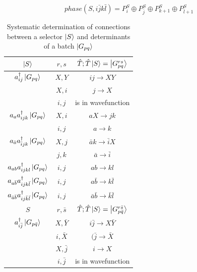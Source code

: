 \documentclass[./thesis.tex]{subfiles}
\newcommand{\Gpqrs}{\ket{G^{rs}_{pq}}}
\begin{document}
\begin{equation}
phase(S,i\bar jk\bar l) = P^S_i \oplus P^S_{\bar j} \oplus P^S_{k+1} \oplus P^S_{\bar l+1}
\end{equation}

\newcommand{\Gpq}{\ket {G_{pq}}}
\newcommand{\Gpbq}{\ket {G_{p \bar q}}}

\begin{table}

\caption{Systematic determination of connections between a selector $\ket S$ and determinants of a batch $\Gpq$} 
\label{tab:systematic_determination}
\begin{center}
	\begin{tabular}{ c|c|c }
		\hline \hline \rule{0pt}{3ex}
		$\ket S$									&$ r, s$ 	& $\hat T ; \hat T \ket S = \Gpqrs$	\\
		\hline \hline \rule{0pt}{3ex}
		$\ac {ij} \Gpq$						& $X,Y$ 	&$ij \rightarrow XY$		\\
											& $X,i$ 	&$j \rightarrow X$		\\
											& $i,j$ 	&is in wavefunction			\\
		\hline \rule{0pt}{3ex}
		$\an a \ac {ijk} \Gpq$				&$X,i$		&$aX \rightarrow jk$		\\
											&$i,j$		&$a \rightarrow k$		\\
		\hline \rule{0pt}{3ex}
		$\an {\bar a} \ac {\bar i jk} \Gpq$	&$X,j$		&$\bar a k \rightarrow \bar i X$		\\
											&$j,k$		&$\bar a \rightarrow \bar i$		\\
		\hline \rule{0pt}{3ex}
		$\an {ab} \ac {ijkl} \Gpq$			&$i,j$		&$ab \rightarrow kl$		\\
		\hline \rule{0pt}{3ex}
		$\an {a  \bar b} \ac {ijk \bar l} \Gpq$			&$i,j$		&$a \bar b \rightarrow k \bar l$		\\
		\hline \rule{0pt}{3ex}
		$\an {\bar a \bar b} \ac {i j \bar k \bar l} \Gpq$	&$i,j$		&$\bar a \bar b \rightarrow \bar k \bar l$		\\
		
		\hline \hline \rule{0pt}{3ex}
		$S$									&$ r, \bar s$ 	& $\hat T ; \hat T \ket S = \ket {G_{p \bar q}^{r \bar s}}$	\\
		\hline \hline \rule{0pt}{3ex}
		$\ac {i \bar j} \Gpbq$				& $X, \bar Y$ 	&$i \bar j \rightarrow X \bar Y$		\\
											& $i,\bar X$ 		&$(\bar j \rightarrow \bar X$		\\
											& $X,\bar j$ 	&$i \rightarrow X$		\\
											& $i,\bar j$ 	&is in wavefunction			\\
											

\end{tabular}
\end{center}
\end{table}
\end{document}
